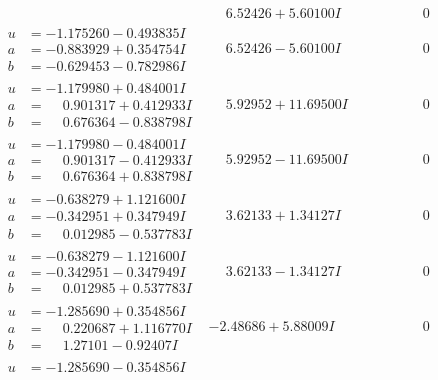 \documentclass[1p]{elsarticle_modified}
\theoremstyle{definition}
\begin{document}
$$\begin{array}{c|c|c}
 & \phantom{-}6.52426 + 5.60100 I & \phantom{-0.000000 } 0 \\ \hline\begin{aligned}
u &= -1.175260 - 0.493835 I \\
a &= -0.883929 + 0.354754 I \\
b &= -0.629453 - 0.782986 I\end{aligned}
 & \phantom{-}6.52426 - 5.60100 I & \phantom{-0.000000 } 0 \\ \hline\begin{aligned}
u &= -1.179980 + 0.484001 I \\
a &= \phantom{-}0.901317 + 0.412933 I \\
b &= \phantom{-}0.676364 - 0.838798 I\end{aligned}
 & \phantom{-}5.92952 + 11.69500 I & \phantom{-0.000000 } 0 \\ \hline\begin{aligned}
u &= -1.179980 - 0.484001 I \\
a &= \phantom{-}0.901317 - 0.412933 I \\
b &= \phantom{-}0.676364 + 0.838798 I\end{aligned}
 & \phantom{-}5.92952 - 11.69500 I & \phantom{-0.000000 } 0 \\ \hline\begin{aligned}
u &= -0.638279 + 1.121600 I \\
a &= -0.342951 + 0.347949 I \\
b &= \phantom{-}0.012985 - 0.537783 I\end{aligned}
 & \phantom{-}3.62133 + 1.34127 I & \phantom{-0.000000 } 0 \\ \hline\begin{aligned}
u &= -0.638279 - 1.121600 I \\
a &= -0.342951 - 0.347949 I \\
b &= \phantom{-}0.012985 + 0.537783 I\end{aligned}
 & \phantom{-}3.62133 - 1.34127 I & \phantom{-0.000000 } 0 \\ \hline\begin{aligned}
u &= -1.285690 + 0.354856 I \\
a &= \phantom{-}0.220687 + 1.116770 I \\
b &= \phantom{-}1.27101 - 0.92407 I\end{aligned}
 & -2.48686 + 5.88009 I & \phantom{-0.000000 } 0 \\ \hline\begin{aligned}
u &= -1.285690 - 0.354856 I \\

\end{aligned}
\end{array}$$
\end{document}
